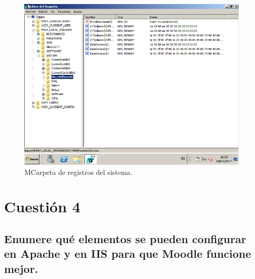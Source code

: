 	\begin{figure}[H] %
		\centering
		\includegraphics[scale=0.5]{imagenes/HKEY_LOCAL.png}  %
		\caption{MCarpeta de registros del sistema.} \label{fig:figura12}
	\end{figure}
	

\section{Cuestión 4}

\subsection{\Large Enumere qué elementos se pueden configurar en Apache y en IIS para que Moodle funcione mejor.}

